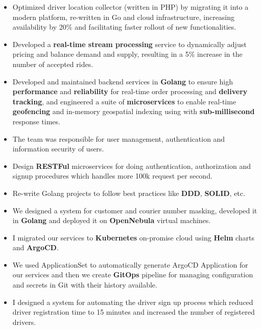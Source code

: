 \vspace{0.5cm}

\begin{itemize}
      \item Optimized driver location collector (written in PHP) by migrating it into a modern platform, re-written in Go and cloud infrastructure,
            increasing availability by 20\% and facilitating faster rollout of new functionalities.
      \item Developed a \textbf{real-time stream processing} service to dynamically adjust pricing and balance demand and supply,
            resulting in a 5\% increase in the number of accepted rides.
      \item Developed and maintained backend services in \textbf{Golang} to ensure
            high \textbf{performance} and \textbf{reliability} for real-time order processing and \textbf{delivery tracking},
            and engineered a suite of \textbf{microservices} to enable real-time \textbf{geofencing} and in-memory geospatial
            indexing using  with \textbf{sub-millisecond} response times.
      \item The team was responsible for user management, authentication and information security of users.
      \item Design \textbf{RESTFul} microservices for doing authentication, authorization and signup procedures which handles more 100k request per second.
      \item Re-write Golang projects to follow best practices like \textbf{DDD}, \textbf{SOLID}, etc.
      \item We designed a system for customer and courier number masking, developed it in \textbf{Golang} and deployed it on \textbf{OpenNebula} virtual machines.
      \item I migrated our services to \textbf{Kubernetes} on-promise cloud using \textbf{Helm} charts and \textbf{ArgoCD}.
      \item We used  ApplicationSet to automatically generate ArgoCD Application for our services and then we create \textbf{GitOps} pipeline for managing configuration and secrets in Git with their history available.
      \item I designed a system for automating the driver sign up process which reduced driver registration time to 15 minutes and increased the number of registered drivers.

\end{itemize}
